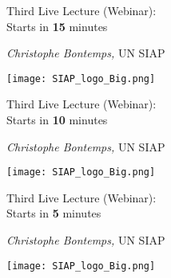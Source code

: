 \documentclass[xcolor=x11names,compress, aspectratio=169]{beamer}
\renewcommand{\(}{\begin{columns}}
\renewcommand{\)}{\end{columns}}
\newcommand{\<}[1]{\begin{column}{#1}}
\renewcommand{\>}{\end{column}}
\begin{document}
\begin{frame}
\Large{ \color{siap}{Machine Learning for Official Statistics and SDGs}}
\vspace{0.5cm}

{\huge\textcolor{brique}{Third Live Lecture (Webinar): \\
\vspace{0.2cm}
Starts in \textbf{15} minutes\\
}}

\vspace{0.5cm}
\begin{center}
\textcolor{siap}{\textit{Christophe Bontemps,} UN  SIAP\\ }
\vspace{1cm}

\texttt{[image: SIAP\_logo\_Big.png]}
\end{center}
\end{frame}

\begin{frame}
\Large{ \color{siap}{Machine Learning for Official Statistics and SDGs}}
\vspace{0.5cm}

{\huge\textcolor{brique}{Third Live Lecture (Webinar): \\
\vspace{0.2cm}
Starts in \textbf{10} minutes\\
}}

\vspace{0.5cm}
\begin{center}
\textcolor{siap}{\textit{Christophe Bontemps,} UN  SIAP\\ }
\vspace{1cm}

\texttt{[image: SIAP\_logo\_Big.png]}
\end{center}
\end{frame}

\begin{frame}
\Large{ \color{siap}{Machine Learning for Official Statistics and SDGs}}
\vspace{0.5cm}

{\huge\textcolor{brique}{Third Live Lecture (Webinar): \\
\vspace{0.2cm}
Starts in \textbf{5} minutes\\
}}

\vspace{0.5cm}
\begin{center}
\textcolor{siap}{\textit{Christophe Bontemps,} UN  SIAP\\ }
\vspace{1cm}

\texttt{[image: SIAP\_logo\_Big.png]}
\end{center}
\end{frame}
\end{document}
